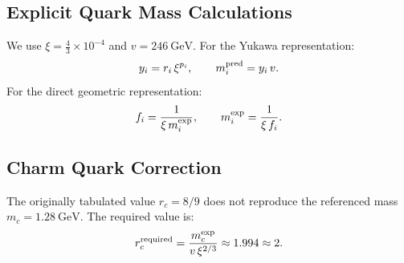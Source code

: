 	\subsection{Explicit Quark Mass Calculations}
	\label{subsec:quark_calculations}
	
	We use $\xi=\tfrac{4}{3}\times10^{-4}$ and $v=246\ \mathrm{GeV}$.
	For the Yukawa representation:
	\[
	y_i = r_i\,\xi^{p_i},\qquad m_i^{\rm pred}=y_i\,v.
	\]
	For the direct geometric representation:
	\[
	f_i=\frac{1}{\xi\, m_i^{\rm exp}},\qquad m_i^{\rm exp}=\frac{1}{\xi\, f_i}.
	\]
	
	\begin{table}[h!]
		\centering
		\caption{Yukawa predictions with corrected $r_i,p_i$ and comparison with reference masses (PDG~2024).}
	\end{table}
	
	\subsection{Charm Quark Correction}
	\label{subsec:charm_correction}
	
	The originally tabulated value $r_c=8/9$ does not reproduce the referenced mass $m_c=1.28\ \mathrm{GeV}$. The required value is:
	\[
	r_c^{\rm required}=\frac{m_c^{\rm exp}}{v\,\xi^{2/3}}\approx 1.994 \approx 2.
	\]
	

